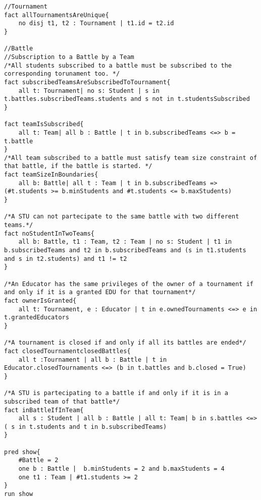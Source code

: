 \begin{lstlisting}[language=Alloy,  label={lst:alloycode}, basicstyle=\fontfamily{Roboto}\selectfont\ttfamily]
//Tournament
fact allTournamentsAreUnique{
	no disj t1, t2 : Tournament | t1.id = t2.id
}

//Battle
//Subscription to a Battle by a Team
/*All students subscribed to a battle must be subscribed to the corresponding torunament too. */
fact subscribedTeamsAreSubscribedToTournament{
    all t: Tournament| no s: Student | s in t.battles.subscribedTeams.students and s not in t.studentsSubscribed
}

fact teamIsSubscribed{
	all t: Team| all b : Battle | t in b.subscribedTeams <=> b = t.battle
}
/*All team subscribed to a battle must satisfy team size constraint of that battle, if the battle is started. */
fact teamSizeInBoundaries{
    all b: Battle| all t : Team | t in b.subscribedTeams => (#t.students >= b.minStudents and #t.students <= b.maxStudents)
}    

/*A STU can not partecipate to the same battle with two different teams.*/
fact noStudentInTwoTeams{
    all b: Battle, t1 : Team, t2 : Team | no s: Student | t1 in b.subscribedTeams and t2 in b.subscribedTeams and (s in t1.students and s in t2.students) and t1 != t2
}
    
/*An Educator has the same privileges of the owner of a tournament if and only if it is a granted EDU for that tournament*/
fact ownerIsGranted{
    all t: Tournament, e : Educator | t in e.ownedTournaments <=> e in t.grantedEducators
}

/*A tournament is closed if and only if all its battles are ended*/
fact closedTournamentclosedBattles{
	all t :Tournament | all b : Battle | t in Educator.closedTournaments <=> (b in t.battles and b.closed = True)
}

/*A STU is partecipating to a battle if and only if it is in a subscribed team of that battle*/
fact inBattleIfInTeam{
    all s : Student | all b : Battle | all t: Team| b in s.battles <=> ( s in t.students and t in b.subscribedTeams)
}

pred show{
	#Battle = 2
	one b : Battle |  b.minStudents = 2 and b.maxStudents = 4
	one t1 : Team | #t1.students >= 2
}
run show
\end{lstlisting}